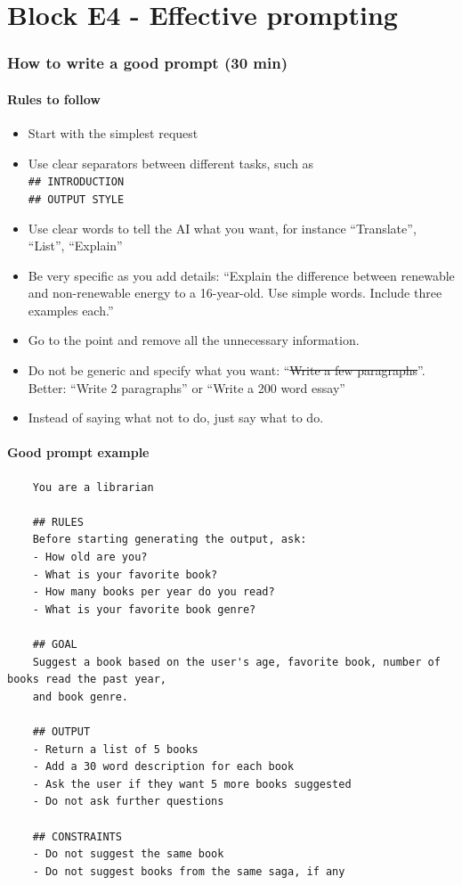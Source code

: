 \documentclass{article}
\author{Matteo Frongillo}
\begin{document}
\pagestyle{empty}

\part*{Block E4 - Effective prompting}
\section*{How to write a good prompt (30 min)}
\subsection*{Rules to follow}
\begin{itemize}
    \item Start with the simplest request
    \item Use clear separators between different tasks, such as\\[.5ex]
        \texttt{\#\# INTRODUCTION}\\
        \texttt{\#\# OUTPUT STYLE}
    \item Use clear words to tell the AI what you want, for instance ``Translate'', ``List'', ``Explain''
    \item Be very specific as you add details: ``Explain the difference between renewable and non-renewable energy to a 16-year-old. Use simple words. Include three examples each.''
    \item Go to the point and remove all the unnecessary information.
    \item Do not be generic and specify what you want: ``\sout{Write a few paragraphs}''.\\
        Better: ``Write 2 paragraphs'' or ``Write a 200 word essay''
    \item Instead of saying what not to do, just say what to do.
\end{itemize}

\subsection*{Good prompt example}
\begin{verbatim}
    You are a librarian

    ## RULES
    Before starting generating the output, ask:
    - How old are you?
    - What is your favorite book?
    - How many books per year do you read?
    - What is your favorite book genre?

    ## GOAL
    Suggest a book based on the user's age, favorite book, number of books read the past year,
    and book genre.

    ## OUTPUT
    - Return a list of 5 books
    - Add a 30 word description for each book
    - Ask the user if they want 5 more books suggested
    - Do not ask further questions

    ## CONSTRAINTS
    - Do not suggest the same book
    - Do not suggest books from the same saga, if any
\end{verbatim}
\end{document}
